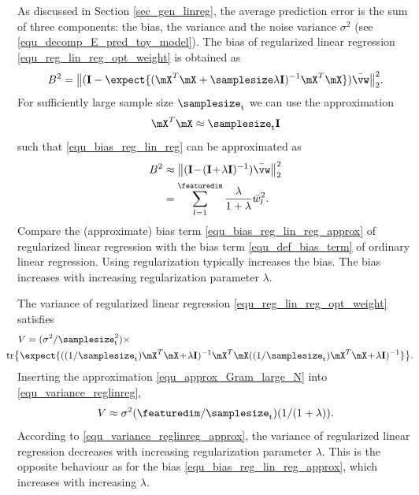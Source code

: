 \documentclass[12pt]{report}
\begin{document}
As discussed in Section \ref{sec_gen_linreg}, the average prediction 
error is the sum of three components: the bias, the variance and the 
noise variance $\sigma^{2}$ (see \eqref{equ_decomp_E_pred_toy_model}). 
The bias of regularized linear regression \eqref{equ_reg_lin_reg_opt_weight} 
is obtained as 
\begin{equation} 
\label{equ_bias_reg_lin_reg}
B^{2} = \big \| (\mathbf{I} - \expect \{ ( \mX^{T} \mX +  \samplesize \lambda \mathbf{I})^{-1} \mX^{T} \mX  \})  \bar{\vw} \big  \|^{2}_{2}. 
\end{equation} 
For sufficiently large sample size $\samplesize_{\rm t}$ we can use the approximation 
\begin{equation} 
\label{equ_approx_Gram_large_N}
\mX^{T} \mX  \approx \samplesize_{\rm t} \mathbf{I} 
\end{equation} 
such that \eqref{equ_bias_reg_lin_reg} can be approximated as 
 \begin{align} 
\label{equ_bias_reg_lin_reg_approx}
B^{2} & \approx \big \| (\mathbf{I}\!-\!(\mathbf{I}\!+\!\lambda \mathbf{I})^{-1} ) \bar{\vw} \big  \|^{2}_{2} \nonumber \\
& =  \sum_{l=1}^{\featuredim} \frac{\lambda}{1+\lambda} \bar{w}_{l}^2 .
\end{align} 
Compare the (approximate) bias term \eqref{equ_bias_reg_lin_reg_approx} 
of regularized linear regression with the bias term \eqref{equ_def_bias_term} of 
ordinary linear regression. Using regularization typically increases the bias. 
The bias increases with increasing regularization parameter $\lambda$. 

The variance of regularized linear regression \eqref{equ_reg_lin_reg_opt_weight} satisfies 
\begin{align}
\label{equ_variance_reglinreg}
V & =( \sigma^{2}/\samplesize^{2}_{\rm t}) \times \nonumber \\ 
& \hspace*{-7mm} {\rm tr} \big\{  \expect \{  ( (1/\samplesize_{\rm t}) \mX^{T} \mX\!+\!\lambda \mathbf{I} )^{-1} \mX^{T} \mX ( (1/\samplesize_{\rm t}) \mX^{T} \mX\!+\!\lambda \mathbf{I} )^{-1}   \} \big\}.
\end{align}
Inserting the approximation \eqref{equ_approx_Gram_large_N} into \eqref{equ_variance_reglinreg},  
\begin{equation}
\label{equ_variance_reglinreg_approx}
V \approx \sigma^{2} (\featuredim/\samplesize_{\rm t}) (1/(1+ \lambda)).
\end{equation} 
According to \eqref{equ_variance_reglinreg_approx}, the variance of regularized linear 
regression decreases with increasing regularization parameter $\lambda$. This is the 
opposite behaviour as for the bias \eqref{equ_bias_reg_lin_reg_approx}, which increases 
with increasing $\lambda$. 
\end{document}
